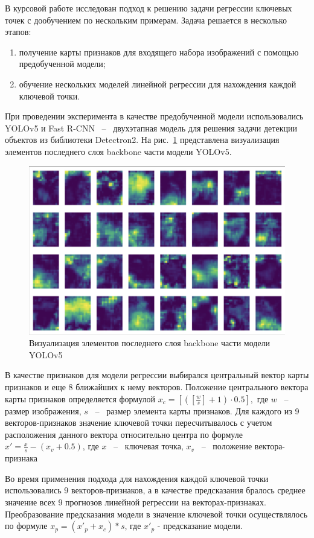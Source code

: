 \documentclass[a4paper,14pt]{article}
\begin{document}
    В курсовой работе исследован подход к решению задачи регрессии ключевых точек с дообучением по нескольким примерам. 
    Задача решается в несколько этапов:
     \begin{enumerate}
    	[1)]
    	\itemsep0em
    	\item получение карты признаков для входящего набора изображений с помощью предобученной модели;
    	\item обучение нескольких моделей линейной регрессии для нахождения каждой ключевой точки.
    \end{enumerate}
	При проведении эксперимента в качестве предобученной модели использовались YOLOv5 и Fast R-CNN ~--~ двухэтапная модель для решения задачи детекции объектов из библиотеки Detectron2. 
	На рис.~\ref{fig:stage9_SPPF_features} представлена визуализация элементов последнего слоя backbone части модели YOLOv5.
	\begin{figure}[H]
		\centering
		\includegraphics[width=0.7\linewidth]{images/stage9_SPPF_features}
		\caption{Визуализация элементов последнего слоя backbone части модели YOLOv5}
		\label{fig:stage9_SPPF_features}
	\end{figure}
	
	В качестве признаков для модели регрессии выбирался центральный вектор карты признаков и еще 8 ближайших к нему векторов. 
	Положение центрального вектора карты признаков определяется формулой $x_c =\left[\left( [\frac{w}{s}]+1\right) \cdot 0.5\right],$ где $w$ ~--~ размер изображения, $s$ ~--~ размер элемента карты признаков.
	Для каждого из 9 векторов-признаков значение ключевой точки пересчитывалось с учетом расположения данного вектора относительно центра по формуле $x' = \frac{x}{s} - (x_v + 0.5)$, где $x$ ~--~ ключевая точка, $x_v$ ~--~ положение вектора-признака
	
	Во время применения подхода для нахождения каждой ключевой точки использовались 9 векторов-признаков, а в качестве предсказания бралось среднее значение всех 9 прогнозов линейной регрессии на векторах-признаках. 
	Преобразование предсказания модели в значение ключевой точки осуществлялось по формуле $x_p = (x'_p +  x_c) * s$, где $x'_p$ - предсказание модели.
    
\end{document}
